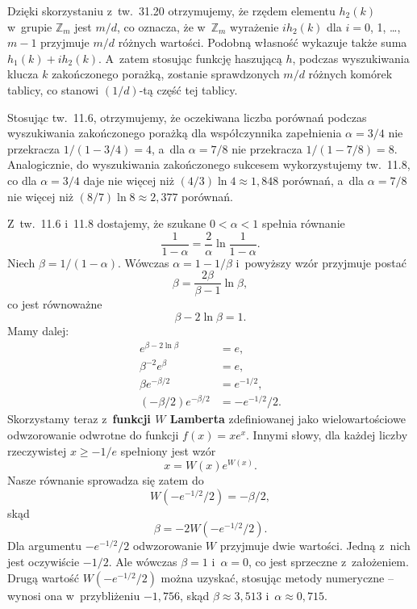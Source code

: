 \exercise %
Dzięki skorzystaniu z~tw.\ 31.20 otrzymujemy, że rzędem elementu $h_2(k)$ w~grupie $\mathbb{Z}_m$ jest $m/d$, co oznacza, że w~$\mathbb{Z}_m$ wyrażenie $ih_2(k)$ dla $i=0$, 1, \dots, $m-1$ przyjmuje $m/d$ różnych wartości.
Podobną własność wykazuje także suma $h_1(k)+ih_2(k)$.
A~zatem stosując funkcję haszującą $h$, podczas wyszukiwania klucza $k$ zakończonego porażką, zostanie sprawdzonych $m/d$ różnych komórek tablicy, co stanowi $(1/d)$-tą część tej tablicy.

\exercise %

\noindent Stosując tw.\ 11.6, otrzymujemy, że oczekiwana liczba porównań podczas wyszukiwania zakończonego porażką dla współczynnika zapełnienia $\alpha=3/4$ nie przekracza $1/(1-3/4)=4$, a~dla $\alpha=7/8$ nie przekracza $1/(1-7/8)=8$.
Analogicznie, do wyszukiwania zakończonego sukcesem wykorzystujemy tw.\ 11.8, co dla $\alpha=3/4$ daje nie więcej niż $(4/3)\ln4\approx1{,}848$ porównań, a~dla $\alpha=7/8$ nie więcej niż $(8/7)\ln8\approx2{,}377$ porównań.

\exercise %
Z~tw.\ 11.6 i~11.8 dostajemy, że szukane $0<\alpha<1$ spełnia równanie
\[
	\frac{1}{1-\alpha} = \frac{2}{\alpha}\ln\frac{1}{1-\alpha}.
\]
Niech $\beta=1/(1-\alpha)$.
Wówczas $\alpha=1-1/\beta$ i~powyższy wzór przyjmuje postać
\[
	\beta = \frac{2\beta}{\beta-1}\ln\beta,
\]
co jest równoważne
\[
	\beta-2\ln\beta = 1.
\]
Mamy dalej:
\begin{align*}
	e^{\beta-2\ln\beta} &= e, \\
	\beta^{-2}e^\beta &= e, \\
	\beta e^{-\beta/2} &= e^{-1/2}, \\
	(-\beta/2)e^{-\beta/2} &= -e^{-1/2}\!/2.
\end{align*}
Skorzystamy teraz z~\textbf{funkcji $W$ Lamberta} \cite{lambertwfunction} zdefiniowanej jako wielowartościowe odwzorowanie odwrotne do funkcji $f(x)=xe^x$.
Innymi słowy, dla każdej liczby rzeczywistej $x\ge-1/e$ spełniony jest wzór
\[
	x = W(x)e^{W(x)}.
\]
Nasze równanie sprowadza się zatem do
\[
	W(-e^{-1/2}\!/2) = -\beta/2,
\]
skąd
\[
	\beta = -2W(-e^{-1/2}\!/2).
\]
Dla argumentu $-e^{-1/2}\!/2$ odwzorowanie $W$ przyjmuje dwie wartości.
Jedną z~nich jest oczywiście $-1/2$.
Ale wówczas $\beta=1$ i~$\alpha=0$, co jest sprzeczne z~założeniem.
Drugą wartość $W(-e^{-1/2}\!/2)$ można uzyskać, stosując metody numeryczne -- wynosi ona w~przybliżeniu $-1{,}756$, skąd $\beta\approx3{,}513$ i~$\alpha\approx0{,}715$.
